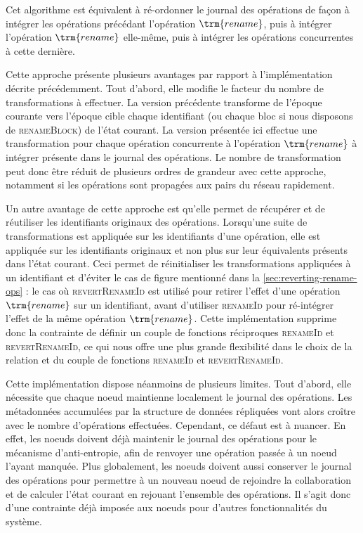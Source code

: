 Cet algorithme est équivalent à ré-ordonner le journal des opérations de façon à intégrer les opérations précédant l'opération $\trm{rename}$, puis à intégrer l'opération $\trm{rename}$ elle-même, puis à intégrer les opérations concurrentes à cette dernière.

Cette approche présente plusieurs avantages par rapport à l'implémentation décrite précédemment.
Tout d'abord, elle modifie le facteur du nombre de transformations à effectuer.
La version précédente transforme de l'époque courante vers l'époque cible chaque identifiant (ou chaque bloc si nous disposons de \textsc{renameBlock}) de l'état courant.
La version présentée ici effectue une transformation pour chaque opération concurrente à l'opération $\trm{rename}$ à intégrer présente dans le journal des opérations.
Le nombre de transformation peut donc être réduit de plusieurs ordres de grandeur avec cette approche, notamment si les opérations sont propagées aux pairs du réseau rapidement.

Un autre avantage de cette approche est qu'elle permet de récupérer et de réutiliser les identifiants originaux des opérations.
Lorsqu'une suite de transformations est appliquée sur les identifiants d'une opération, elle est appliquée sur les identifiants originaux et non plus sur leur équivalents présents dans l'état courant.
Ceci permet de réinitialiser les transformations appliquées à un identifiant et d'éviter le cas de figure mentionné dans la \autoref{sec:reverting-rename-ops} : le cas où \textsc{revertRenameId} est utilisé pour retirer l'effet d'une opération $\trm{rename}$ sur un identifiant, avant d'utiliser \textsc{renameId} pour ré-intégrer l'effet de la même opération $\trm{rename}$.
Cette implémentation supprime donc la contrainte de définir un couple de fonctions réciproques \textsc{renameId} et \textsc{revertRenameId}, ce qui nous offre une plus grande flexibilité dans le choix de la relation \lepoch et du couple de fonctions \textsc{renameId} et \textsc{revertRenameId}.

Cette implémentation dispose néanmoins de plusieurs limites.
Tout d'abord, elle nécessite que chaque noeud maintienne localement le journal des opérations.
Les métadonnées accumulées par la structure de données répliquées vont alors croître avec le nombre d'opérations effectuées.
Cependant, ce défaut est à nuancer.
En effet, les noeuds doivent déjà maintenir le journal des opérations pour le mécanisme d'anti-entropie, afin de renvoyer une opération passée à un noeud l'ayant manquée.
Plus globalement, les noeuds doivent aussi conserver le journal des opérations pour permettre à un nouveau noeud de rejoindre la collaboration et de calculer l'état courant en rejouant l'ensemble des opérations.
Il s'agit donc d'une contrainte déjà imposée aux noeuds pour d'autres fonctionnalités du système.


